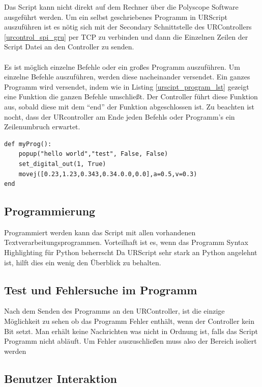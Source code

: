 Das Script kann nicht direkt auf dem Rechner über die Polyscope Software ausgeführt werden. Um ein selbst geschriebenes Programm in URScript auszuführen ist es nötig sich mit der Secondary Schnittstelle des URControllers \ref{urcontrol_spi_gru} per TCP zu verbinden und dann die Einzelnen Zeilen der Script Datei an den Controller zu senden.
\\\\
Es ist möglich einzelne Befehle oder ein großes Programm auszuführen. Um einzelne Befehle auszuführen, werden diese nacheinander versendet.
Ein ganzes Programm wird versendet, indem wie in Listing \ref{urscipt_program_lst} gezeigt eine Funktion die ganzen Befehle umschließt. Der Controller führt diese Funktion aus, sobald diese mit dem ``end'' der Funktion abgeschlossen ist.
Zu beachten ist nocht, dass der URcontroller am Ende jeden Befehls oder Programm's ein Zeilenumbruch erwartet.

\begin{lstlisting}[caption={Kleines Beispielprogram in URScript}, label=lst:urscipt_program_lst ,captionpos=b] 
def myProg():
	popup("hello world","test", False, False)
	set_digital_out(1, True)
	movej([0.23,1.23,0.343,0.34.0.0,0.0],a=0.5,v=0.3)
end
\end{lstlisting}

\subsection{Programmierung}
\label{programmierung_ur_script_rel}

Programmiert werden kann das Script mit allen vorhandenen Textverarbeitungsprogrammen. Vorteilhaft ist es, wenn das Programm \ac{Syntax Highlighting} für Python beherrscht Da URScript sehr stark an Python angelehnt ist, hilft dies ein wenig den Überblick zu behalten.

\subsection{Test und Fehlersuche im Programm}
\label{ur_script_debuggen}

Nach dem Senden des Programms an den URController, ist die einzige Möglichkeit zu sehen ob das Programm Fehler enthält, wenn der Controller kein  Bit setzt. Man erhält keine Nachrichten was nicht in Ordnung ist, falls das Script Programm nicht abläuft. Um Fehler auszuschließen muss also der Bereich isoliert werden

\subsection{Benutzer Interaktion}
\label{ur_script_user_interaction}


